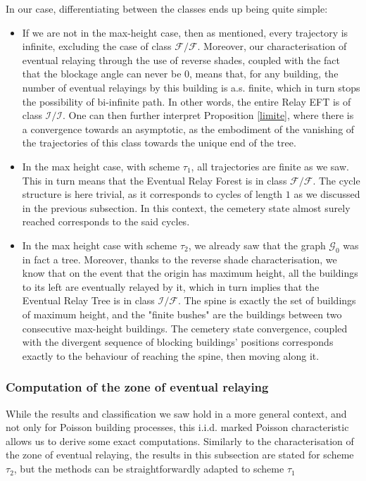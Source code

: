 \documentclass[10pt,english,a4paper]{smfart}
\theoremstyle{definition}
\theoremstyle{remark}
\newcommand{\graph}{\mathcal{G}}
\begin{document}
In our case, differentiating between the classes ends up being quite simple:
\begin{itemize}
    \item If we are not in the max-height case, then as mentioned, every trajectory is infinite, excluding the case of class $\mathcal{F}/\mathcal{F}$. Moreover, our characterisation of eventual relaying through the use of reverse shades, coupled with the fact that the blockage angle can never be $0$, means that, for any building, the number of eventual relayings by this building is a.s. finite, which in turn stops the possibility of bi-infinite path. In other words, the entire Relay EFT is of class $\mathcal{I}/\mathcal{I}$. One can then further interpret Proposition \ref{limite}, where there is a convergence towards an asymptotic, as the embodiment of the vanishing of the trajectories of this class towards the unique end of the tree.
    \item In the max height case, with scheme $\tau_1$, all trajectories are finite as we saw. This in turn means that the Eventual Relay Forest is in class $\mathcal{F}/\mathcal{F}$. The cycle structure is here trivial, as it corresponds to cycles of length $1$ as we discussed in the previous subsection. In this context, the cemetery state almost surely reached corresponds to the said cycles.
    \item In the max height case with scheme $\tau_2$, we already saw that the graph $\graph_0$ was in fact a tree. Moreover, thanks to the reverse shade characterisation, we know that on the event that the origin has maximum height, all the buildings to its left are eventually relayed by it, which in turn implies that the Eventual Relay Tree is in class $\mathcal{I}/\mathcal{F}$. The spine is exactly the set of buildings of maximum height, and the "finite bushes" are the buildings between two consecutive max-height buildings. The cemetery state convergence, coupled with the divergent sequence of blocking buildings' positions corresponds exactly to the behaviour of reaching the spine, then moving along it. 
\end{itemize}

\subsubsection*{Computation of the zone of eventual relaying}

While the results and classification we saw hold in a more general context, and not only for Poisson building processes, this i.i.d. marked Poisson characteristic allows us to derive some exact computations. Similarly to the characterisation of the zone of eventual relaying, the results in this subsection are stated for scheme $\tau_2$, but the methods can be straightforwardly adapted to scheme $\tau_1$
\end{document}
